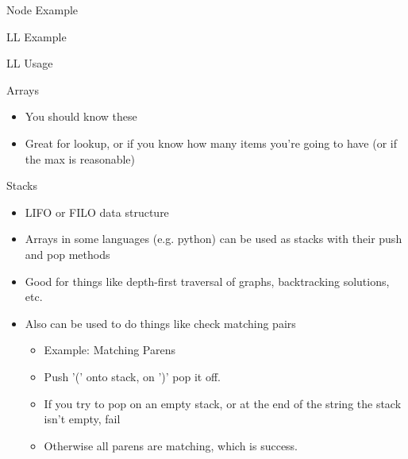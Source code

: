 \documentclass{beamer}
\begin{document}
\begin{frame}{Node Example}
  
\end{frame}

\begin{frame}{LL Example}
  
\end{frame}

\begin{frame}{LL Usage}
  
\end{frame}

\begin{frame}{Arrays}
  \begin{centering}
    \begin{itemize}
     \item You should know these
     \item Great for lookup, or if you know how many items you're going to have (or if the max is reasonable)
    \end{itemize}
  \end{centering}
\end{frame}


\begin{frame}{Stacks}
  \begin{centering}
    \begin{itemize}
      \item LIFO or FILO data structure
      \item Arrays in some languages (e.g. python) can be used as stacks with their push and pop methods
      \item Good for things like depth-first traversal of graphs, backtracking solutions, etc.
      \item Also can be used to do things like check matching pairs 
      \begin{itemize}
        \item Example: Matching Parens
        \item Push '(' onto stack, on ')' pop it off. 
        \item If you try to pop on an empty stack, or at the end of the string the stack isn't empty, fail
        \item Otherwise all parens are matching, which is success.
      \end{itemize}
    \end{itemize}
  \end{centering}
\end{frame}
\end{document}
